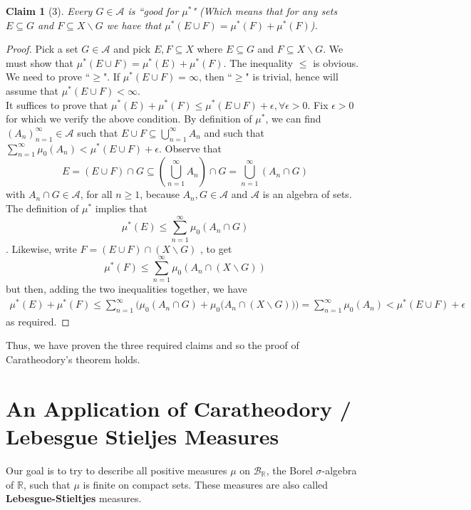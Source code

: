 \documentclass[letterpaper, 12pt]{article}
\newcommand{\cB}{\mathcal{B}}
\newcommand{\bR}{\mathbb{R}}
\newcommand{\sA}{\mathcal{A}}
\theoremstyle{stdthm}
\theoremstyle{stddef}
\theoremstyle{stdnonum}
\newtheorem{claim}{Claim}
\theoremstyle{stdqands}
\theoremstyle{stdbold}
\begin{document}
\begin{claim}[3]
Every $G \in \sA$ is ``good for $\mu^*$" (Which means that for any sets $E \subseteq G$ and $F \subseteq X\backslash G$ we have that $\mu^*(E \cup F) = \mu^*(F) + \mu^*(F)$). 
\end{claim}
\begin{proof}
Pick a set $G \in \sA$ and pick $E,F \subseteq X$ where $E\subseteq G$ and $F \subseteq X\backslash G$. We must show that $\mu^* (E \cup F) = \mu^*(E) + \mu^*(F)$. The inequality $\leq$ is obvious. We need to prove ``$\geq$". If $\mu^*(E \cup F) = \infty$, then ``$\geq$" is trivial, hence will assume that $\mu^*(E \cup F) < \infty$. \\

It suffices to prove that $\mu^*(E) + \mu^*(F) \leq \mu^*(E \cup F) + \epsilon, \forall \epsilon >0$. Fix $\epsilon >0$ for which we verify the above condition. By definition of $\mu^*$, we can find $(A_n)_{n=1}^\infty \in \sA$ such that $E \cup F \subseteq \bigcup_{n=1}^\infty A_n$ and such that 
$\sum_{n=1}^\infty \mu_0(A_n) < \mu^*(E\cup F) + \epsilon$.
Observe that 
\[ E = (E\cup F) \cap G \subseteq \left( \bigcup_{n=1}^\infty A_n \right) \cap G = \bigcup_{n=1}^\infty \left( A_n \cap G \right) \]
with $A_n \cap G \in \sA$, for all $n\geq 1$, because $A_n,G \in \sA$ and $\sA$ is an algebra of sets. The definition of $\mu^*$ implies that \[ \mu^*(E) \leq \sum_{n=1}^\infty \mu_0 (A_n \cap G)\]. Likewise, write $F = (E \cup F) \cap (X \backslash G)$ , to get 
\[\mu^*(F) \leq \sum_{n=1}^\infty \mu_0 (A_n \cap (X \backslash G)) \]
but then, adding the two inequalities together, we have 
\begin{align*}
\mu^*(E) + \mu^*(F) \leq \sum_{n=1}^\infty \Big( \mu_0 (A_n \cap G) + \mu_0 \big(A_n \cap (X \backslash G)\big) \Big) = \sum_{n=1}^\infty \mu_0(A_n) < \mu^*(E \cup F) + \epsilon
\end{align*}
as required. 
\end{proof}

Thus, we have proven the three required claims and so the proof of Caratheodory's theorem holds. 

\newpage

\section{An Application of Caratheodory / Lebesgue Stieljes Measures}

Our goal is to try to describe all positive measures $\mu$ on $\cB_\bR$, the Borel $\sigma$-algebra of $\bR$, such that $\mu$ is finite on compact sets. These measures are also called  {\bf Lebesgue-Stieltjes} measures. 
\end{document}
